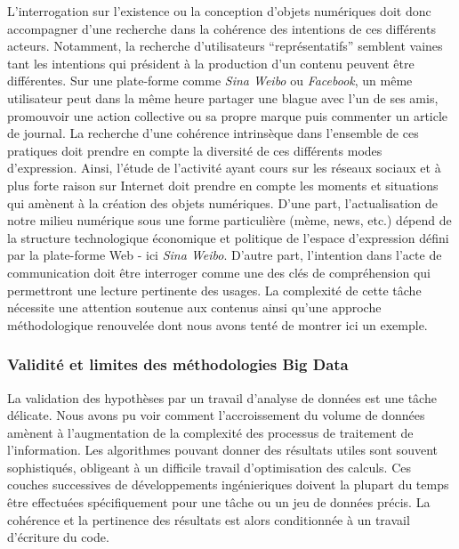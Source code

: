 L'interrogation sur l'existence ou la conception d'objets numériques doit donc accompagner d'une recherche dans la cohérence des intentions de ces différents acteurs. Notamment, la recherche d'utilisateurs ``représentatifs'' semblent vaines tant les intentions qui président à la production d'un contenu peuvent être différentes. Sur une plate-forme comme \textit{Sina Weibo} ou \textit{Facebook}, un même utilisateur peut dans la même heure partager une blague avec l'un de ses amis, promouvoir une action collective ou sa propre marque puis commenter un article de journal. La recherche d'une cohérence intrinsèque dans l'ensemble de ces pratiques doit prendre en compte la diversité de ces différents modes d'expression. Ainsi, l'étude de l'activité ayant cours sur les réseaux sociaux et à plus forte raison sur Internet doit prendre en compte les moments et situations qui amènent à la création des objets numériques. D'une part, l'actualisation de notre milieu numérique sous une forme particulière (mème, news, etc.) dépend de la structure technologique économique et politique de l'espace d'expression défini par la plate-forme Web - ici \textit{Sina Weibo}. D'autre part, l'intention dans l'acte de communication doit être interroger comme une des clés de compréhension qui permettront une lecture pertinente des usages. La complexité de cette tâche nécessite une attention soutenue aux contenus ainsi qu'une approche méthodologique renouvelée dont nous avons tenté de montrer ici un exemple.


\subsubsection[Validité et limites des méthodologies Big Data]{Validité et limites des méthodologies Big Data}


La validation des hypothèses par un travail d'analyse de données est une tâche délicate. Nous avons pu voir comment l'accroissement du volume de données amènent à l'augmentation de la complexité des processus de traitement de l'information. Les algorithmes pouvant donner des résultats utiles sont souvent sophistiqués, obligeant à un difficile travail d'optimisation des calculs. Ces couches successives de développements ingénieriques doivent la plupart du temps être effectuées spécifiquement pour une tâche ou un jeu de données précis. La cohérence et la pertinence des résultats est alors conditionnée à un travail d'écriture du code. 

